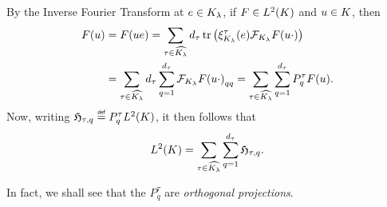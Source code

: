 By the Inverse Fourier Transform at $e \in \IsotropySubgroup{\CompactGroup}{\lambda}$,
if $F \in \Lebesgue{2}{\CompactGroup}$ and $u \in \CompactGroup$, then
\begin{align*}
    F(u)
    &= F(u e) = \sum_{\tau \in \dualGroup{\IsotropySubgroup{\CompactGroup}{\lambda}}} \dimRep{\tau} \tr\left(\Rep[\IsotropySubgroup{\CompactGroup}{\lambda}]{\tau}(e) \Fourier[\IsotropySubgroup{\CompactGroup}{\lambda}]{F(u \dummy)}\right)\\
    &= \sum_{\tau \in \dualGroup{\IsotropySubgroup{\CompactGroup}{\lambda}}} \dimRep{\tau} \sum_{q = 1}^{\dimRep{\tau}} {\Fourier[\IsotropySubgroup{\CompactGroup}{\lambda}]{F(u \dummy)}}_{qq}
    = \sum_{\tau \in \dualGroup{\IsotropySubgroup{\CompactGroup}{\lambda}}} \sum_{q = 1}^\dimRep\tau P^\tau_q F(u).
\end{align*}
Now, writing $\Hilbert{\tau}{q} \defeq P^\tau_q \Lebesgue{2}{\CompactGroup}$,
it then follows that
\begin{align*}
    \Lebesgue{2}{\CompactGroup}
    = \sum_{\tau \in \dualGroup{\IsotropySubgroup{\CompactGroup}{\lambda}}} \sum_{q = 1}^\dimRep\tau \Hilbert{\tau}{q}.
\end{align*}

In fact, we shall see that the $P^\tau_q$ are \emph{orthogonal projections}.

